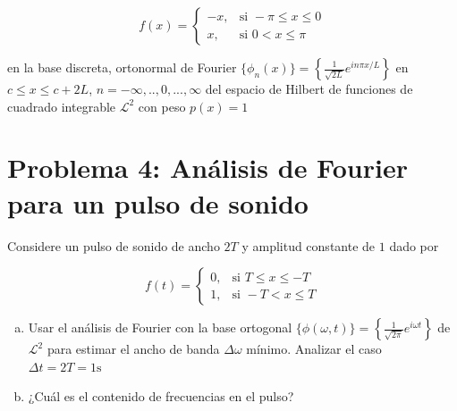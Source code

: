 \documentclass[a4paper]{article}
\begin{document}
$$
f(x) =
\begin{cases}
-x, & \text{si }  -\pi \leq x \leq 0 \\
x, & \text{si } 0 < x \leq \pi
\end{cases}
$$

en la base discreta, ortonormal de Fourier $\{\phi_n(x)\} = 	\left\{\frac{1}{\sqrt{2L}}e^{i n\pi x /L}\right\}$ en $c\leq x \leq c+2L$, $n=-\infty, .., 0, ..., \infty$ del espacio de Hilbert de funciones de cuadrado integrable $\mathscr{L}^2$ con peso $p(x)=1$


\section{Problema 4: Análisis de Fourier para un pulso de sonido}

Considere un pulso de sonido de ancho $2T$ y amplitud constante de $1$ dado por

$$
f(t) =
\begin{cases}
0, & \text{si }  T \leq x \leq -T \\
1, & \text{si } -T < x \leq T
\end{cases}
$$

\begin{enumerate}[a.]
	\item Usar el análisis de Fourier con la base ortogonal $\{\phi(\omega, t)\} = \left\{\frac{1}{\sqrt{2\pi}}e^{i \omega t}\right\}$ de $\mathscr{L}^2$ para estimar el ancho de banda $\Delta \omega$ mínimo. Analizar el caso $\Delta t = 2T=1\text{s}$
	\item ¿Cuál es el contenido de frecuencias en el pulso? 
	
\end{enumerate}



 
\end{document}
